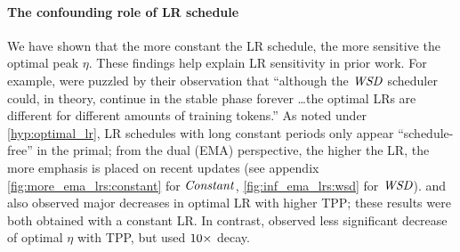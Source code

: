 \paragraph{The confounding role of LR schedule}

We have shown that the more constant the LR schedule, the more
sensitive the optimal peak $\eta$.
These findings help explain LR sensitivity in prior work.
%
For example, \citet{shen2024power} were puzzled by their observation
that ``although the $\mbox{\emph{WSD}}$ scheduler could, in theory, continue in the
stable phase forever \ldots the optimal LRs are different for different
amounts of training tokens.''
%
As noted under \cref{hyp:optimal_lr}, LR schedules with long constant
periods only appear ``schedule-free'' in the primal; from the dual
(EMA) perspective, the higher the LR, the more emphasis is placed on
recent updates (see appendix
\cref{fig:more_ema_lrs:constant} for $\mbox{\emph{Constant}}$, 
\cref{fig:inf_ema_lrs:wsd} for $\mbox{\emph{WSD}}$).
%
\citet{filatov2024time} and \citet[Figure~19]{yang2022mup} also
observed major decreases in optimal LR with higher TPP; these results
were both obtained with a constant LR\@.
%
In contrast, \citet{bjorck2024scaling} observed less significant
decrease of optimal $\eta$ with TPP, but used $\mbox{10}\times$ decay.

